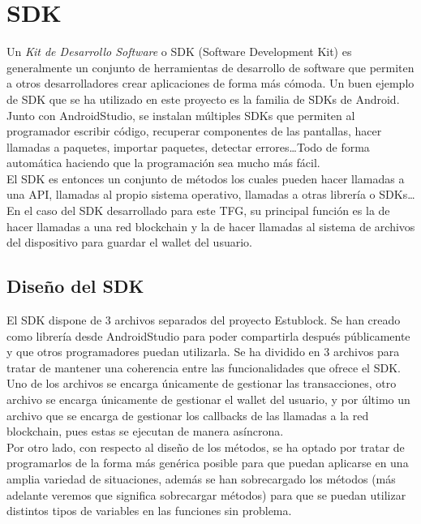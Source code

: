 \section{SDK} \label{sec:SDK}

Un \emph{Kit de Desarrollo Software} o SDK (Software Development Kit) es generalmente un conjunto de herramientas de desarrollo de software que permiten a otros desarrolladores crear aplicaciones de forma más cómoda. Un buen ejemplo de SDK que se ha utilizado en este proyecto es la familia de SDKs de Android. Junto con AndroidStudio, se instalan múltiples SDKs que permiten al programador escribir código, recuperar componentes de las pantallas, hacer llamadas a paquetes, importar paquetes, detectar errores\dots Todo de forma automática haciendo que la programación sea mucho más fácil. \\

El SDK es entonces un conjunto de métodos los cuales pueden hacer llamadas a una API, llamadas al propio sistema operativo, llamadas a otras librería o SDKs\dots En el caso del SDK desarrollado para este TFG, su principal función es la de hacer llamadas a una red blockchain y la de hacer llamadas al sistema de archivos del dispositivo para guardar el wallet del usuario. 

\subsection{Diseño del SDK}

El SDK dispone de 3 archivos separados del proyecto Estublock. Se han creado como librería desde AndroidStudio para poder compartirla después públicamente y que otros programadores puedan utilizarla. Se ha dividido en 3 archivos para tratar de mantener una coherencia entre las funcionalidades que ofrece el SDK. Uno de los archivos se encarga únicamente de gestionar las transacciones, otro archivo se encarga únicamente de gestionar el wallet del usuario, y por último un archivo que se encarga de gestionar los callbacks de las llamadas a la red blockchain, pues estas se ejecutan de manera asíncrona. \\

Por otro lado, con respecto al diseño de los métodos, se ha optado por tratar de programarlos de la forma más genérica posible para que puedan aplicarse en una amplia variedad de situaciones, además se han sobrecargado los métodos (más adelante veremos que significa sobrecargar métodos) para que se puedan utilizar distintos tipos de variables en las funciones sin problema. 

